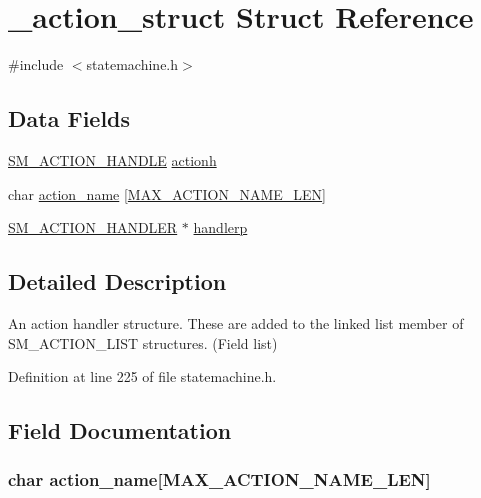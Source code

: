\hypertarget{struct__action__struct}{\section{\-\_\-action\-\_\-struct Struct Reference}
\label{struct__action__struct}
}


{\ttfamily \#include $<$statemachine.\-h$>$}

\subsection*{Data Fields}
\begin{DoxyCompactItemize}
\item 
\hyperlink{statemachine_8h_a49cb86c3ee19747e43ffc473b6ba14a0}{S\-M\-\_\-\-A\-C\-T\-I\-O\-N\-\_\-\-H\-A\-N\-D\-L\-E} \hyperlink{struct__action__struct_a87a885769fc28e2a0b66f0d169e05d90}{actionh}
\item 
char \hyperlink{struct__action__struct_aabe1fe785d72e29bd76c61ad97c0ac5d}{action\-\_\-name} \mbox{[}\hyperlink{statemachine_8h_ac186e74b9bd4a8b61fde81aa6a9fb158}{M\-A\-X\-\_\-\-A\-C\-T\-I\-O\-N\-\_\-\-N\-A\-M\-E\-\_\-\-L\-E\-N}\mbox{]}
\item 
\hyperlink{statemachine_8h_ac2460354b049c36e1a12924bbda9e3ea}{S\-M\-\_\-\-A\-C\-T\-I\-O\-N\-\_\-\-H\-A\-N\-D\-L\-E\-R} $\ast$ \hyperlink{struct__action__struct_ac35034228daf46ee499eff841375110c}{handlerp}
\end{DoxyCompactItemize}


\subsection{Detailed Description}
An action handler structure. These are added to the linked list member of S\-M\-\_\-\-A\-C\-T\-I\-O\-N\-\_\-\-L\-I\-S\-T structures. (Field list) 

Definition at line 225 of file statemachine.\-h.



\subsection{Field Documentation}
\hypertarget{struct__action__struct_aabe1fe785d72e29bd76c61ad97c0ac5d}{
\subsubsection[{action\-\_\-name}]{\setlength{\rightskip}{0pt plus 5cm}char action\-\_\-name\mbox{[}{\bf M\-A\-X\-\_\-\-A\-C\-T\-I\-O\-N\-\_\-\-N\-A\-M\-E\-\_\-\-L\-E\-N}\mbox{]}}}\label{struct__action__struct_aabe1fe785d72e29bd76c61ad97c0ac5d}


